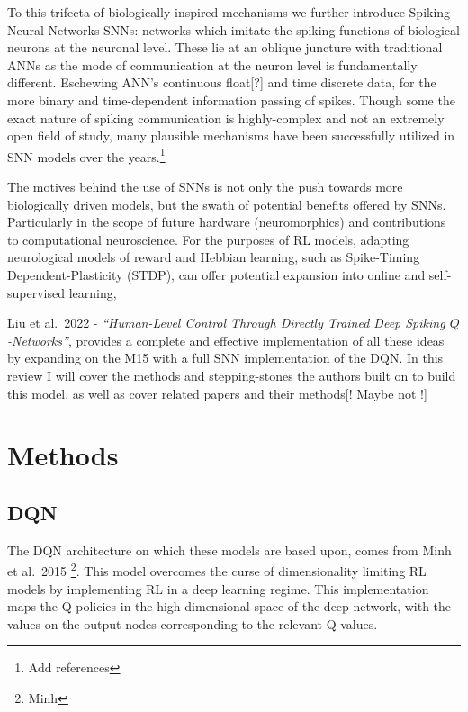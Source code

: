 To this trifecta of biologically inspired mechanisms we further
introduce Spiking Neural Networks SNNs: networks which imitate the
spiking functions of biological neurons at the neuronal level. These lie
at an oblique juncture with traditional ANNs as the mode of
communication at the neuron level is fundamentally different. Eschewing
ANN's continuous float{[}?{]} and time discrete data, for the more
binary and time-dependent information passing of spikes. Though some the
exact nature of spiking communication is highly-complex and not an
extremely open field of study, many plausible mechanisms have been
successfully utilized in SNN models over the years.\footnote{Add
  references}

The motives behind the use of SNNs is not only the push towards more
biologically driven models, but the swath of potential benefits offered
by SNNs. Particularly in the scope of future hardware (neuromorphics)
and contributions to computational neuroscience. For the purposes of RL
models, adapting neurological models of reward and Hebbian learning,
such as Spike-Timing Dependent-Plasticity (STDP), can offer potential
expansion into online and self-supervised learning,

Liu et al.~2022 - \emph{``Human-Level Control Through Directly Trained
Deep Spiking \(Q\)-Networks''}, provides a complete and effective
implementation of all these ideas by expanding on the M15 with a full
SNN implementation of the DQN. In this review I will cover the methods
and stepping-stones the authors built on to build this model, as well as
cover related papers and their methods{[}! Maybe not !{]}

\hypertarget{methods}{%
\section{Methods}\label{methods}}

\hypertarget{dqn}{%
\subsection{DQN}\label{dqn}}

The DQN architecture on which these models are based upon, comes from
Minh et al.~2015 \footnote{Minh}. This model overcomes the curse of
dimensionality limiting RL models by implementing RL in a deep learning
regime. This implementation maps the Q-policies in the high-dimensional
space of the deep network, with the values on the output nodes
corresponding to the relevant Q-values.

